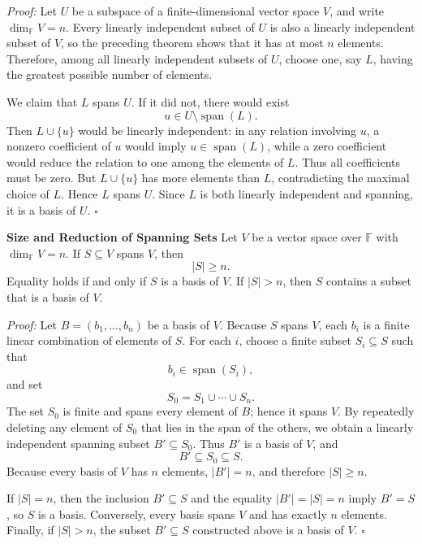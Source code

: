 \documentclass[a4paper,11pt,abstract=true]{scrartcl}
\theoremstyle{dotlessP}
\theoremstyle{dotlessS}
\theoremstyle{remark}
\theoremstyle{definition}
\begin{document}
\begin{claim_box}
\textit{Proof:} Let $U$ be a subspace of a finite-dimensional vector space
$V$, and write $\dim_{\mathbb{F}} V=n$. Every linearly independent subset of $U$ is also
a linearly independent subset of $V$, so the preceding theorem shows that it
has at most $n$ elements. Therefore, among all linearly independent subsets
of $U$, choose one, say $L$, having the greatest possible number of elements.

We claim that $L$ spans $U$. If it did not, there would exist
\[
u\in U\setminus\operatorname{span}(L).
\]
Then $L\cup\{u\}$ would be linearly independent: in any relation involving
$u$, a nonzero coefficient of $u$ would imply
$u\in\operatorname{span}(L)$, while a zero coefficient would reduce the
relation to one among the elements of $L$. Thus all coefficients must be
zero. But $L\cup\{u\}$ has more elements than $L$, contradicting the maximal
choice of $L$. Hence $L$ spans $U$. Since $L$ is both linearly independent
and spanning, it is a basis of $U$. \hfill$\square$
\end{claim_box}

\begin{problem_box}
\textbf{Size and Reduction of Spanning Sets}
Let $V$ be a vector
space over $\mathbb{F}$ with $\dim_{\mathbb{F}} V=n$. If $S\subseteq V$ spans $V$, then
\[
|S|\geq n.
\]
Equality holds if and only if $S$ is a basis of $V$. If $|S|>n$, then $S$
contains a subset that is a basis of $V$.
\end{problem_box}

\begin{claim_box}
\textit{Proof:} Let $B=(b_1,\ldots,b_n)$ be a basis of $V$. Because $S$
spans $V$, each $b_i$ is a finite linear combination of elements of $S$.
For each $i$, choose a finite subset $S_i\subseteq S$ such that
\[
b_i\in\operatorname{span}(S_i),
\]
and set
\[
S_0=S_1\cup\cdots\cup S_n.
\]
The set $S_0$ is finite and spans every element of $B$; hence it spans $V$.
By repeatedly deleting any element of $S_0$ that lies in the span of the
others, we obtain a linearly independent spanning subset $B'\subseteq S_0$.
Thus $B'$ is a basis of $V$, and
\[
B'\subseteq S_0\subseteq S.
\]
Because every basis of $V$ has $n$ elements, $|B'|=n$, and therefore
$|S|\geq n$.

If $|S|=n$, then the inclusion $B'\subseteq S$ and the equality
$|B'|=|S|=n$ imply $B'=S$, so $S$ is a basis. Conversely, every basis spans
$V$ and has exactly $n$ elements. Finally, if $|S|>n$, the subset
$B'\subseteq S$ constructed above is a basis of $V$. \hfill$\square$
\end{claim_box}
\end{document}
